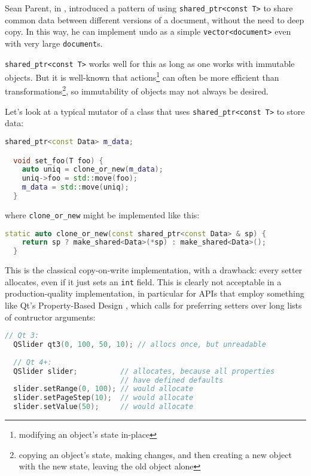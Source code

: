 \documentclass[11pt]{article}
\newcommand{\sptr}{\texttt{shared\_ptr}}
\newcommand{\sptrcT}{\texttt{\sptr<const T>}}
\begin{document}
Sean Parent, in \cite{Seasoning}, introduced a pattern of using
\sptrcT{} to share common data between different versions
of a document, without the need to deep copy. In this way, he can
implement undo as a simple \texttt{vector<document>} even with very
large \texttt{document}s.

\sptrcT{} works well for this as long as one works with immutable
objects. But it is well-known that actions\footnote{modifying an
  object's state in-place} can often be more efficient than
transformations\footnote{copying an object's state, making changes,
  and then creating a new object with the new state, leaving the old
  object alone}, so immutability of objects may not always be desired.

Let's look at a typical mutator of a class that uses \sptrcT{} to store
data:

\begin{lstlisting}[language=C++,caption={Typical mutator of a class that uses \sptrcT}]
  shared_ptr<const Data> m_data;

  void set_foo(T foo) {
    auto uniq = clone_or_new(m_data);
    uniq->foo = std::move(foo);
    m_data = std::move(uniq);
  }
\end{lstlisting}

where \texttt{clone\_or\_new} might be implemented like this:

\begin{lstlisting}[language=C++,caption={Inefficient implementation of \texttt{clone\_or\_new()}}]
  static auto clone_or_new(const shared_ptr<const Data> & sp) {
    return sp ? make_shared<Data>(*sp) : make_shared<Data>();
  }
\end{lstlisting}

This is the classical copy-on-write implementation, with a drawback:
every setter allocates, even if it just sets an \texttt{int}
field. This is clearly not acceptable in a production-quality
implementation, in particular for APIs that employ something like Qt's
\cite{qt} Property-Based Design \cite{property_based}, which calls for
preferring setters over long lists of contructor arguments:

\begin{lstlisting}[language=C++,caption={Comparison between Qt~3 and Qt~4 slider creation}]
  // Qt 3:
  QSlider qt3(0, 100, 50, 10); // allocs once, but unreadable
  
  // Qt 4+:
  QSlider slider;          // allocates, because all properties
                           // have defined defaults
  slider.setRange(0, 100); // would allocate
  slider.setPageStep(10);  // would allocate
  slider.setValue(50);     // would allocate
\end{lstlisting}
\end{document}
